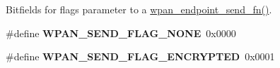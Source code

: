 \label{_amgrp01747264fe7bf50731df0522c351974e}%
Bitfields for {\ttfamily flags} parameter to a \hyperlink{group__wpan__aps_ga505477d0257efe527747c6d1f561cd6c}{wpan\+\_\+endpoint\+\_\+send\+\_\+fn()}. \begin{DoxyCompactItemize}
\item 
\mbox{\label{group__wpan__aps_ga527d35044842aa4e58eb3c4134eb968d}} 
\#define {\bfseries W\+P\+A\+N\+\_\+\+S\+E\+N\+D\+\_\+\+F\+L\+A\+G\+\_\+\+N\+O\+NE}~0x0000
\item 
\mbox{\label{group__wpan__aps_ga5b0b8ed1c327d9da8beb9dec38d3117a}} 
\#define {\bfseries W\+P\+A\+N\+\_\+\+S\+E\+N\+D\+\_\+\+F\+L\+A\+G\+\_\+\+E\+N\+C\+R\+Y\+P\+T\+ED}~0x0001
\end{DoxyCompactItemize}
\label{_amgrp01747264fe7bf50731df0522c351974e}%
